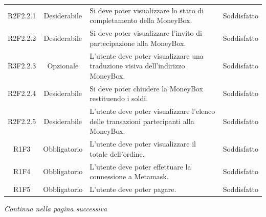 \begin{table}[H]
\begin{tabular}{c | c | p{6cm} | c }
        R2F2.2.1                                                          & Desiderabile & Si deve poter visualizzare lo stato di completamento della MoneyBox\glo{}.                    & Soddisfatto                                 \\
        R2F2.2.2                                                          & Desiderabile & Si deve poter visualizzare l'invito di partecipazione alla MoneyBox\glo{}.                    & Soddisfatto                                 \\
        R3F2.2.3                                                          & Opzionale    & L'utente deve poter visualizzare una traduzione visiva dell'indirizzo MoneyBox\glo{}.         & Soddisfatto        \\
        R2F2.2.4                                                          & Desiderabile & Si deve poter chiudere la MoneyBox\glo{} restituendo i soldi.                                 & Soddisfatto                                  \\
        R2F2.2.5                                                          & Desiderabile & L'utente deve poter visualizzare l'elenco delle transazioni partecipanti alla MoneyBox\glo{}. & Soddisfatto \\
        R1F3                                                              & Obbligatorio & L'utente deve poter visualizzare il totale dell'ordine.                                       & Soddisfatto \\
        R1F4                                                              & Obbligatorio & L'utente deve poter effettuare la connessione a Metamask\glo{}.                               & Soddisfatto   \\
        R1F5                                                              & Obbligatorio & L'utente deve poter pagare.                                                                   & Soddisfatto \\
    \end{tabular}
\end{table}
\begin{center}
    \textit{\small Continua nella pagina successiva}
\end{center}
